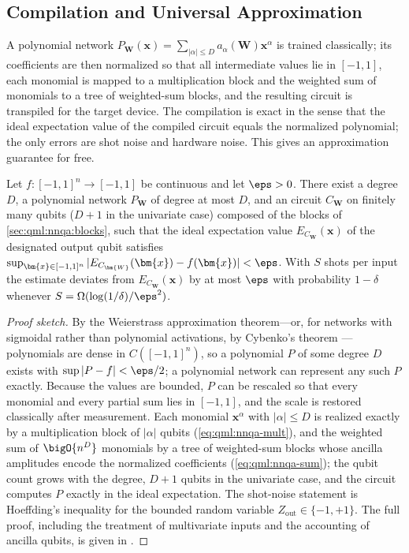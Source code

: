 \subsection{Compilation and Universal Approximation}\label{sec:qml:nnqa:theorem}

A polynomial network $P_{\bm{W}}(\bm{x}) = \sum_{|\alpha| \le D} a_\alpha(\bm{W}) \bm{x}^\alpha$ is trained classically; its coefficients are then normalized so that all intermediate values lie in $[-1,1]$, each monomial is mapped to a multiplication block and the weighted sum of monomials to a tree of weighted-sum blocks, and the resulting circuit is transpiled for the target device. The compilation is exact in the sense that the ideal expectation value of the compiled circuit equals the normalized polynomial; the only errors are shot noise and hardware noise. This gives an approximation guarantee for free.

\begin{theorem}\label{thm:qml:nnqa-ua}
Let $f \colon [-1,1]^n \to [-1,1]$ be continuous and let $\eps > 0$. There exist a degree $D$, a polynomial network $P_{\bm{W}}$ of degree at most $D$, and an \nnqa{} circuit $C_{\bm{W}}$ on finitely many qubits ($D+1$ in the univariate case) composed of the blocks of \cref{sec:qml:nnqa:blocks}, such that the ideal expectation value $E_{C_{\bm{W}}}(\bm{x})$ of the designated output qubit satisfies $\sup_{\bm{x} \in [-1,1]^n} |E_{C_{\bm{W}}}(\bm{x}) - f(\bm{x})| < \eps$. With $S$ shots per input the estimate deviates from $E_{C_{\bm{W}}}(\bm{x})$ by at most $\eps$ with probability $1 - \delta$ whenever $S = \Omega(\log(1/\delta)/\eps^2)$.
\end{theorem}

\begin{proof}[Proof sketch]
By the Weierstrass approximation theorem---or, for networks with sigmoidal rather than polynomial activations, by Cybenko's theorem \cite{cybenko1989approximation}---polynomials are dense in $C([-1,1]^n)$, so a polynomial $P$ of some degree $D$ exists with $\sup |P - f| < \eps/2$; a polynomial network can represent any such $P$ exactly. Because the values are bounded, $P$ can be rescaled so that every monomial and every partial sum lies in $[-1,1]$, and the scale is restored classically after measurement. Each monomial $\bm{x}^\alpha$ with $|\alpha| \le D$ is realized exactly by a multiplication block of $|\alpha|$ qubits (\cref{eq:qml:nnqa-mult}), and the weighted sum of $\bigO{n^D}$ monomials by a tree of weighted-sum blocks whose ancilla amplitudes encode the normalized coefficients (\cref{eq:qml:nnqa-sum}); the qubit count grows with the degree, $D+1$ qubits in the univariate case, and the circuit computes $P$ exactly in the ideal expectation. The shot-noise statement is Hoeffding's inequality for the bounded random variable $Z_{\mathrm{out}} \in \{-1,+1\}$. The full proof, including the treatment of multivariate inputs and the accounting of ancilla qubits, is given in \cite{guo2026nnqa}.
\end{proof}

